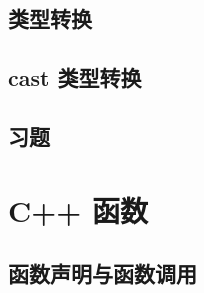 \documentclass{article}
\begin{document}
	
	
	
	
	
	
	
	\subsection{类型转换}
	
	

	

	\subsection{cast 类型转换}
	 
	\subsection{习题}
	
	
	
	\section{C++ 函数}
		\subsection{函数声明与函数调用}
		
\end{document}
